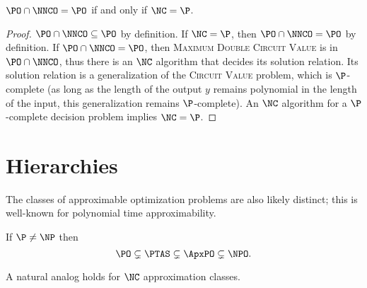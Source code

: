 \begin{theorem}\label{thm:poppo}
  $\PO \cap \NNCO = \PO$ if and only if $\NC = \P$.
\end{theorem}
\begin{proof}
  $\PO \cap \NNCO \subseteq \PO$ by definition.
  If $\NC = \P$, then $\PO \cap \NNCO = \PO$ by definition.
  If $\PO \cap \NNCO = \PO$, then \textsc{Maximum Double Circuit Value} is in $\PO \cap \NNCO$, thus there is an $\NC$ algorithm that decides its solution relation.
  Its solution relation is a generalization of the \textsc{Circuit Value} problem, which is $\P$-complete (as long as the length of the output $y$ remains polynomial in the length of the input, this generalization remains $\P$-complete).
  An $\NC$ algorithm for a $\P$-complete decision problem implies $\NC = \P$.
\end{proof}

\section{Hierarchies}\label{sec:hierarchies}

The classes of approximable optimization problems are also likely distinct; this is well-known for polynomial time approximability.

\begin{theorem}
  If $\P \neq \NP$ then
  \[
  \PO \subsetneq \PTAS \subsetneq \ApxPO \subsetneq \NPO.
  \]
\end{theorem}

A natural analog holds for $\NC$ approximation classes.


